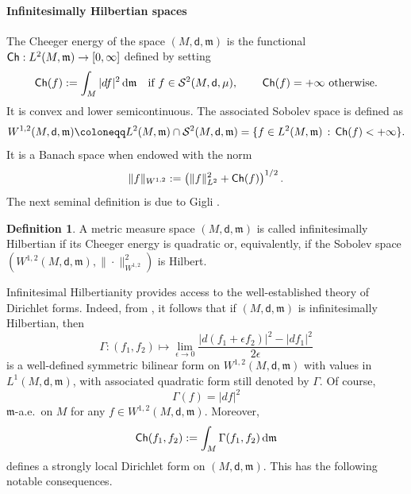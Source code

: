 \documentclass[10pt]{article}
\newcommand{\m}{\mathfrak{m}}
\newcommand{\M}{{\mathit{M}}}
\renewcommand{\d}{\,\mathrm{d}}
\newcommand{\dist}{\mathsf{d}}
\newcommand{\df}{\coloneqq}
\newcommand{\Ch}{{\sf Ch}}
\theoremstyle{plain}
\theoremstyle{definition}
\newtheorem{definition}[theorem]{Definition}
\newcommand{\Ltwo}{L^2(M,\m)}
\newcommand{\Sob}{W^{1,2}(M,\dist,\m)}
\begin{document}
\paragraph{Infinitesimally Hilbertian spaces} The Cheeger energy of the space $(M,\dist,\m)$ is the functional $\Ch:\Ltwo\to [0,\infty]$ defined by setting
\[\Ch (f) :=\int_M|d f|^2\d\m \quad \text{if $f \in \mathcal{S}^2(M,\dist,\mu),$} \qquad \text{ $\Ch (f)=+\infty$ otherwise.}\] 
 It is convex and lower semicontinuous. The associated Sobolev space is defined as
\[
W^{1,2}(M,\dist,\m) \df L^2(M,\m) \cap \mathcal{S}^2(M,\dist,\m) = \{f \in \Ltwo \, : \, \Ch(f) < +\infty\}.
\]
It is a Banach space when endowed with the norm
$$
\|f\|_{W^{1,2}}:=\left(\|f\|_{L^2}^2+\Ch(f)\right)^{1/2}.
$$
The next seminal definition is due to Gigli \cite{Gigli15}.

\begin{definition}
A metric measure space $(M,\dist,\m)$ is called 
infinitesimally Hilbertian if its Cheeger energy is quadratic or, equivalently, if the Sobolev space $(\Sob,\|\cdot\|^2_{W^{1,2}})$ is Hilbert.
\end{definition}

Infinitesimal Hilbertianity provides access to the well-established theory of Dirichlet forms. Indeed, from \cite[Theorem 4.18]{AGSDuke}, it follows that if $(M,\dist,\m)$ is infinitesimally Hilbertian, then
$$
\Gamma : ( f_1, f_2) \mapsto \lim_{\epsilon\to 0}\frac{|d (f_1+\epsilon f_2)|^2-|d f_1|^2}{2\epsilon}
$$
is a well-defined symmetric bilinear form on $\Sob$ with values in $L^1(\M,\dist,\m)$, with associated quadratic form still denoted by $\Gamma$. Of course, $$\Gamma(f)= |df|^2$$ $\m$-a.e.~on $M$ for any $f \in \Sob$. Moreover,
$$
\Ch(f_1,f_2) := \int_M \Gamma ( f_1,  f_2 ) \d \m
$$
defines a strongly local Dirichlet form on $(M,\dist,\m)$.  This has the following notable consequences. 
\end{document}
